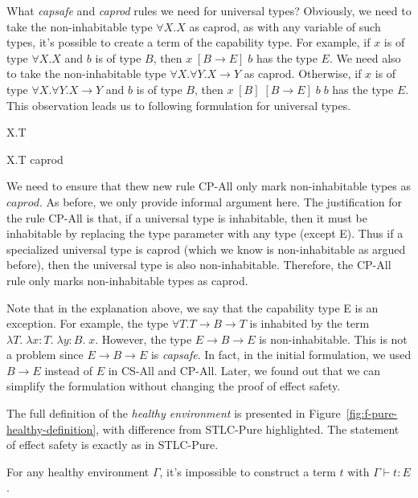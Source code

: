 What \emph{capsafe} and \emph{caprod} rules we need for universal
types? Obviously, we need to take the non-inhabitable type
$\forall X.X$ as caprod, as with any variable of such types, it's
possible to create a term of the capability type. For example, if $x$
is of type $\forall X.X$ and $b$ is of type $B$, then
$x \; [B \to E] \; b$ has the type $E$.  We need also to take the
non-inhabitable type $\forall X. \forall Y. X \to Y$ as
caprod. Otherwise, if $x$ is of type $\forall X. \forall Y. X \to Y$
and $b$ is of type $B$, then $x \; [B] \; [B \to E] \; b \; b$ has the
type $E$. This observation leads us to following formulation for
universal types.

{ \forall X.T \quad {} }

{ \forall X.T \quad caprod }

We need to ensure that thew new rule CP-All only mark
non-inhabitable types as $caprod$. As before, we only provide informal
argument here. The justification for the rule CP-All is that, if a
universal type is inhabitable, then it must be inhabitable by
replacing the type parameter with any type (except E). Thus if a
specialized universal type is caprod (which we know is non-inhabitable
as argued before), then the universal type is also
non-inhabitable. Therefore, the CP-All rule only marks non-inhabitable
types as caprod.

Note that in the explanation above, we say that the capability type E
is an exception. For example, the type $\forall T.T \to B \to T$ is
inhabited by the term
$\lambda T. \; \lambda x:T. \; \lambda y:B. \; x$. However, the type
$E \to B \to E$ is non-inhabitable. This is not a problem since
$E \to B \to E$ is \emph{capsafe}. In fact, in the initial
formulation, we used $B \to E$ instead of $E$ in CS-All and
CP-All. Later, we found out that we can simplify the formulation
without changing the proof of effect safety.

The full definition of the \emph{healthy environment} is presented in
Figure~\ref{fig:f-pure-healthy-definition}, with difference from
STLC-Pure highlighted. The statement of effect safety is exactly as in
STLC-Pure.

\begin{definition}
  For any healthy environment $\Gamma$, it's impossible to construct a
  term $t$ with $\Gamma \vdash t : E$.
\end{definition}

